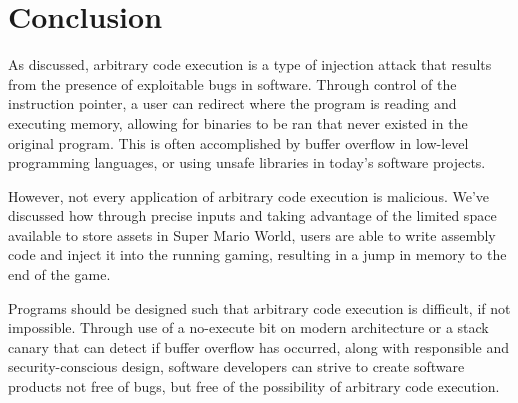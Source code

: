 \section{Conclusion}

As discussed, arbitrary code execution is a type of injection attack that results from the presence of exploitable bugs in software. Through control of the instruction pointer, a user can redirect where the program is reading and executing memory, allowing for binaries to be ran that never existed in the original program. This is often accomplished by buffer overflow in low-level programming languages, or using unsafe libraries in today's software projects. 

However, not every application of arbitrary code execution is malicious. We've discussed how through precise inputs and taking advantage of the limited space available to store assets in Super Mario World, users are able to write assembly code and inject it into the running gaming, resulting in a jump in memory to the end of the game. 

Programs should be designed such that arbitrary code execution is difficult, if not impossible. Through use of a no-execute bit on modern architecture or a stack canary that can detect if buffer overflow has occurred, along with responsible and security-conscious design, software developers can strive to create software products not free of bugs, but free of the possibility of arbitrary code execution.